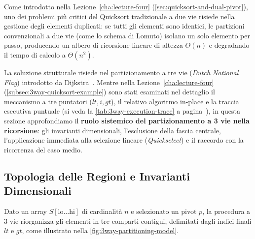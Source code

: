 Come introdotto nella Lezione~\ref{cha:lecture-four} (\autoref{sec:quicksort-and-dual-pivot}), uno dei problemi più critici del Quicksort tradizionale a due vie risiede nella gestione degli elementi duplicati: se tutti gli elementi sono identici, le partizioni convenzionali a due vie (come lo schema di Lomuto) isolano un solo elemento per passo, producendo un albero di ricorsione lineare di altezza $\Theta(n)$ e degradando il tempo di calcolo a $\Theta(n^2)$.

La soluzione strutturale risiede nel partizionamento a tre vie (\textit{Dutch National Flag}) introdotto da Dijkstra~\cite{dijkstra1976}. Mentre nella Lezione~\ref{cha:lecture-four} (\autoref{subsec:3way-quicksort-example}) sono stati esaminati nel dettaglio il meccanismo a tre puntatori ($lt, i, gt$), il relativo algoritmo in-place e la traccia esecutiva puntuale (si veda la \autoref{tab:3way-execution-trace} a pagina~\pageref{tab:3way-execution-trace}), in questa sezione approfondiamo il \textbf{ruolo sistemico del partizionamento a 3 vie nella ricorsione}: gli invarianti dimensionali, l'esclusione della fascia centrale, l'applicazione immediata alla selezione lineare (\textit{Quickselect}) e il raccordo con la ricorrenza del caso medio.

\subsection{Topologia delle Regioni e Invarianti Dimensionali}
\label{subsec:3way-invariants-dimensional}

Dato un array $S[\text{lo} \dots \text{hi}]$ di cardinalità $n$ e selezionato un pivot $p$, la procedura a 3 vie riorganizza gli elementi in tre comparti contigui, delimitati dagli indici finali $lt$ e $gt$, come illustrato nella \autoref{fig:3way-partitioning-model}.

